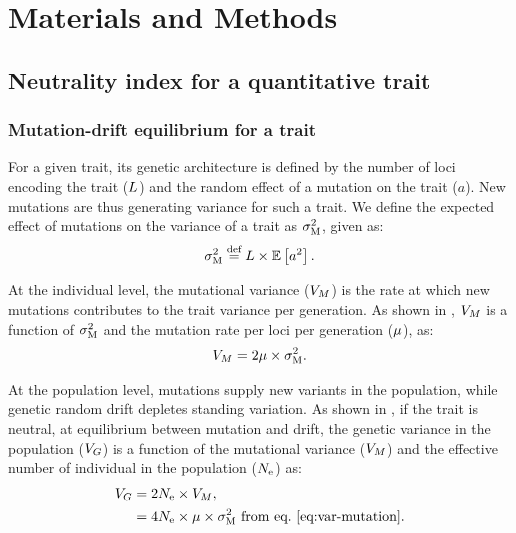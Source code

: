 \documentclass{article}
\begin{document}
\section{Materials and Methods}\label{sec:materials-and-methods}
\subsection{Neutrality index for a quantitative trait}\label{subsec:neutrality-index-for-a-quantitative-trait}
\subsubsection{Mutation-drift equilibrium for a trait}

For a given trait, its genetic architecture is defined by the number of loci encoding the trait ($L$) and the random effect of a mutation on the trait ($a$).
New mutations are thus generating variance for such a trait.
We define the expected effect of mutations on the variance of a trait as $\sigma^2_{\text{M}}$, given as:
\begin{gather}
    \sigma^2_{\text{M}} \stackrel{\text{def}}{=} L \times \operatorname{\mathbb{E}} \left[ a^2 \right]. \label{eq:rate-mut}
\end{gather}

At the individual level, the mutational variance ($V_{M}$) is the rate at which new mutations contributes to the trait variance per generation.
As shown in \textcite{lande_quantitative_1979, lande_sexual_1980}, $V_{M}$ is a function of $\sigma^2_{\text{M}}$ and the mutation rate per loci per generation ($\mu$), as:
\begin{gather}
    V_{M} = 2 \mu \times \sigma^2_{\text{M}} \label{eq:var-mutation}.
\end{gather}

At the population level, mutations supply new variants in the population, while genetic random drift depletes standing variation.
As shown in \textcite{lynch_mutation_1998}, if the trait is neutral, at equilibrium between mutation and drift, the genetic variance in the population ($V_{G}$) is a function of the mutational variance ($V_{M}$) and the effective number of individual in the population ($N_{\text{e}}$) as:
\begin{align}
    V_{G} & =  2 N_{\text{e}} \times V_{M}, \\
    & = 4 N_{\text{e}} \times \mu \times \sigma^2_{\text{M}} \text{ from eq.~\ref{eq:var-mutation}}\label{eq:var-genetic}.
\end{align}
\end{document}
